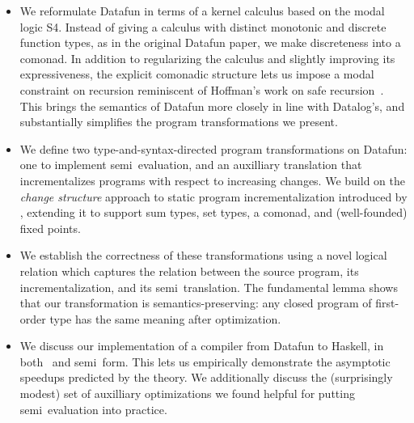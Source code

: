 \begin{itemize}
\item We reformulate Datafun in terms of a kernel calculus based on
  the modal logic S4. Instead of giving a calculus with distinct
  monotonic and discrete function types, as in the original Datafun
  paper, we make discreteness into a comonad. In addition to
  regularizing the calculus and slightly improving its expressiveness,
  the explicit comonadic structure lets us impose a modal constraint
  on recursion reminiscent of Hoffman's work on safe
  recursion~\cite{hofmann-safe-recursion}. This brings the semantics
  of Datafun more closely in line with Datalog's, and substantially
  simplifies the program transformations we present.
  

\item We define two type-and-syntax-directed program transformations on Datafun:
  one to implement semi\naive\ evaluation, and an auxilliary translation that
  incrementalizes programs with respect to increasing changes. We build on the
  \emph{change structure} approach to static program incrementalization
  introduced by \citet{incremental}, extending it to support sum types, set
  types, a comonad, and (well-founded) fixed points.

\item We establish the correctness of these transformations using a novel
  logical relation which captures the relation between the source program, its
  incrementalization, and its semi\naive\ translation. The fundamental lemma
  shows that our transformation is semantics-preserving: any closed program of
  first-order type has the same meaning after optimization.


\item We discuss our implementation of a compiler from Datafun to Haskell, in
  both \naive\ and semi\naive\ form. This lets us empirically demonstrate the
  asymptotic speedups predicted by the theory. We additionally discuss the
  (surprisingly modest) set of auxilliary optimizations we found helpful for
  putting semi\naive\ evaluation into practice.
\end{itemize}
